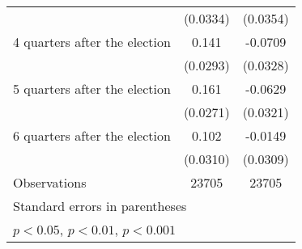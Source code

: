 \begin{table}[htbp]
\begin{tabular}{l*{2}{c}}
                    &    (0.0334)         &    (0.0354)         \\
[1em]
 4 quarters after the election&       0.141\sym{***}&     -0.0709\sym{*}  \\
                    &    (0.0293)         &    (0.0328)         \\
[1em]
 5 quarters after the election&       0.161\sym{***}&     -0.0629         \\
                    &    (0.0271)         &    (0.0321)         \\
[1em]
 6 quarters after the election&       0.102\sym{***}&     -0.0149         \\
                    &    (0.0310)         &    (0.0309)         \\
\hline
Observations        &       23705         &       23705         \\
\hline\hline
\multicolumn{3}{l}{\footnotesize Standard errors in parentheses}\\
\multicolumn{3}{l}{\footnotesize \sym{*} \(p<0.05\), \sym{**} \(p<0.01\), \sym{***} \(p<0.001\)}\\
\end{tabular}
\end{table}
